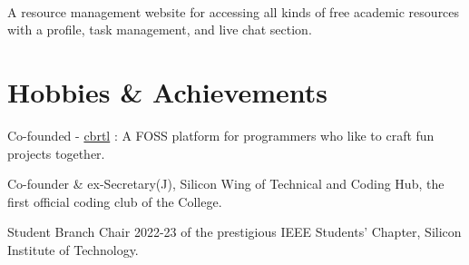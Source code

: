 \documentclass[]{assets/deedy-resume-openfont}
\begin{document}
\hfill {}\\
A resource management website for accessing all kinds of free academic resources with a profile, task management, and live chat section.\\

\sectionsep
%
%
\section{Hobbies \& Achievements}
\begin{tightemize}  
\item Co-founded - \href{https://cbrtl.github.io}{cbrtl} : A FOSS platform for programmers who like to craft fun projects together.\\
\item Co-founder \& ex-Secretary(J), Silicon Wing of Technical and Coding Hub, the first official coding club of the College.\\
\item Student Branch Chair 2022-23 of the prestigious IEEE Students’ Chapter, Silicon Institute of Technology.\\
\end{tightemize}
\ 
\end{document}
